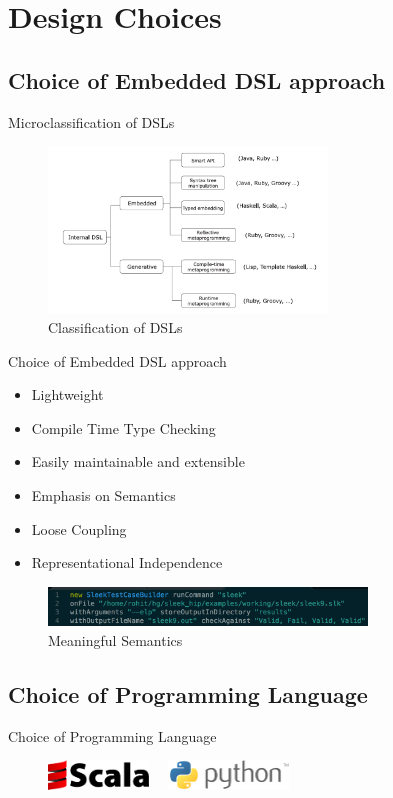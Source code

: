 \section{Design Choices}
\subsection{Choice of Embedded DSL approach}

\begin{frame}{Microclassification of DSLs}
\begin{figure}[H]
  \centering
    \includegraphics[width=280px]{figures/classification.png}
  \caption{Classification of DSLs}
\end{figure}
\end{frame}

\begin{frame}{Choice of Embedded DSL approach}
\begin{itemize}
\item Lightweight
\item Compile Time Type Checking
\item Easily maintainable and extensible
\item Emphasis on Semantics
\item Loose Coupling
\item Representational Independence
\end{itemize}
\begin{figure}[H]
  \centering
    \includegraphics[width=320px]{figures/declarative_syntax.png}
  \caption{Meaningful Semantics}
\end{figure}
\end{frame}

\subsection{Choice of Programming Language}
\begin{frame}{Choice of Programming Language}
\begin{figure}[h!]
    \includegraphics[height=30px]{figures/scala-logo.png}
    \
    \
    \includegraphics[height=30px]{figures/python_lang.png}
\end{figure}
\end{frame}


